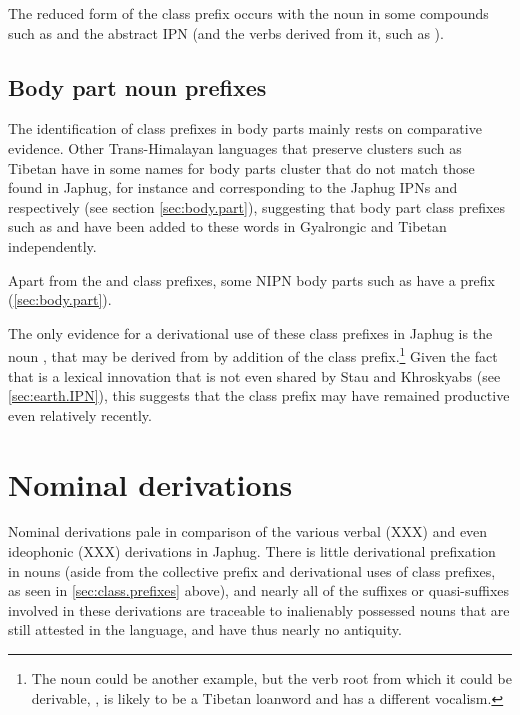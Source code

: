 The reduced form  of the class prefix occurs with the noun  in some compounds such as  and the abstract IPN  (and the verbs derived from it, such as ).
  
\subsection{Body part noun prefixes}  \label{ex:body.part.prefix}
The identification of class prefixes in body parts mainly rests on comparative evidence. Other Trans-Himalayan languages that preserve clusters such as Tibetan have in some names for body parts cluster that do not match those found in Japhug, for instance  and  corresponding to the Japhug IPNs  and  respectively (see section \ref{sec:body.part}), suggesting that body part class prefixes such as  and  have been added to these words in Gyalrongic and Tibetan independently.

Apart from the  and  class prefixes, some NIPN body parts such as  have a   prefix (\ref{sec:body.part}).

The only evidence for a derivational use of these class prefixes in Japhug is the noun , that may be derived from  by addition of the  class prefix.\footnote{The noun  could be another example, but the verb root from which it could be derivable, , is likely to be a Tibetan loanword and has a different vocalism. } Given the fact that  is a lexical innovation that is not even shared by Stau and Khroskyabs (see \ref{sec:earth.IPN}), this suggests that the class prefix  may have remained productive even relatively recently.

\section{Nominal derivations}
Nominal derivations pale in comparison of the various verbal (XXX) and even ideophonic (XXX) derivations in Japhug. There is little derivational prefixation in nouns (aside from the collective  prefix and derivational uses of class prefixes, as seen in \ref{sec:class.prefixes} above), and nearly all of the suffixes or quasi-suffixes involved in these derivations are traceable to inalienably possessed nouns that are still attested in the language, and have thus nearly no antiquity. 

